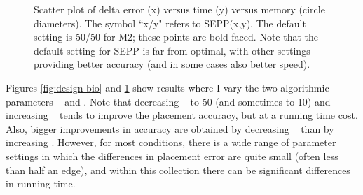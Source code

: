 \begin{figure}[htbp]
  \centering
  \caption{Scatter plot of delta error (x) versus time (y) versus memory
(circle diameters). The symbol ``x/y" refers to SEPP(x,y). The default
setting is 50/50 for M2; these points
are bold-faced. Note that the default setting for SEPP is
far from optimal, with other settings providing
better accuracy (and in some cases also better speed).} 
  \label{fig:design-sim}
\end{figure}


Figures \ref{fig:design-bio} and \ref{fig:design-sim} show results 
where I vary the two algorithmic parameters
\ssa~ and \ssp.
Note that decreasing \ssa~ to 50 (and sometimes to 10) 
and increasing \ssp~ tends to
improve the placement accuracy, but at a running time cost.
Also, bigger improvements in accuracy are obtained by decreasing
\ssa~ than by increasing \ssp.  However, for most conditions,
there is a wide range of parameter settings in which the
differences in placement error are quite
small (often less than half an edge), and
within this collection there can be significant differences in running
time.

